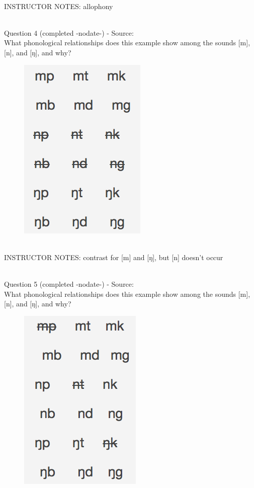\documentclass[12pt]{article}
\begin{document}
~\\
INSTRUCTOR NOTES: allophony


~\\

{\large Question 4} (completed -nodate-) - Source: \\

What phonological relationships does this example show among the sounds [m], [n], and [ŋ], and why?\\

\begin{figure}[H]
\includegraphics{../images/quiz4question5_c.png}
\end{figure}

~\\
INSTRUCTOR NOTES: contrast for [m] and [ŋ], but [n] doesn't occur


~\\

{\large Question 5} (completed -nodate-) - Source: \\

What phonological relationships does this example show among the sounds [m], [n], and [ŋ], and why?\\

\begin{figure}[H]
\includegraphics{../images/quiz4question5_d.png}
\end{figure}
\end{document}
